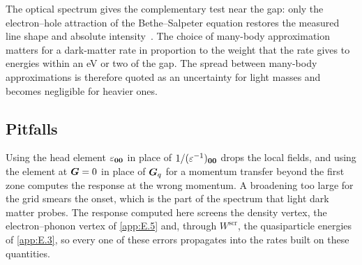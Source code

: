 The optical spectrum gives the complementary test near the gap: only the electron--hole attraction of the Bethe--Salpeter equation restores the measured line shape and absolute intensity~\cite{albrecht1998ab}. The choice of many-body approximation matters for a dark-matter rate in proportion to the weight that the rate gives to energies within an eV or two of the gap. The spread between many-body approximations is therefore quoted as an uncertainty for light masses and becomes negligible for heavier ones.

\subsection{Pitfalls}

Using the head element $\varepsilon_{\bm{0}\bm{0}}$ in place of $1/(\varepsilon^{-1})_{\bm{0}\bm{0}}$ drops the local fields, and using the element at $\bm{G} = 0$ in place of $\bm{G}_q$ for a momentum transfer beyond the first zone computes the response at the wrong momentum. A broadening too large for the grid smears the onset, which is the part of the spectrum that light dark matter probes. The response computed here screens the density vertex, the electron--phonon vertex of \cref{app:E.5} and, through $W^{\mathrm{scr}}$, the quasiparticle energies of \cref{app:E.3}, so every one of these errors propagates into the rates built on these quantities.
